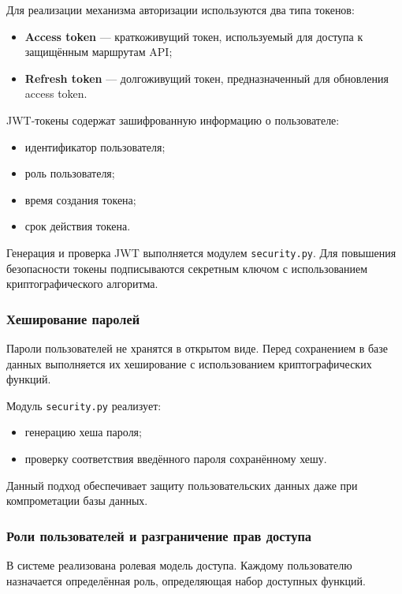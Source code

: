 Для реализации механизма авторизации используются два типа токенов:
\begin{itemize}
	\item \textbf{Access token} — краткоживущий токен, используемый для доступа к защищённым маршрутам API;
	
	\item \textbf{Refresh token} — долгоживущий токен, предназначенный для обновления access token.
\end{itemize}

JWT-токены содержат зашифрованную информацию о пользователе:
\begin{itemize}
	\item идентификатор пользователя;
	\item роль пользователя;
	\item время создания токена;
	\item срок действия токена.
\end{itemize}

Генерация и проверка JWT выполняется модулем \texttt{security.py}. Для повышения безопасности токены подписываются секретным ключом с использованием криптографического алгоритма.

\subsubsection{Хеширование паролей}

Пароли пользователей не хранятся в открытом виде. Перед сохранением в базе данных выполняется их хеширование с использованием криптографических функций.

Модуль \texttt{security.py} реализует:
\begin{itemize}
	\item генерацию хеша пароля;
	\item проверку соответствия введённого пароля сохранённому хешу.
\end{itemize}

Данный подход обеспечивает защиту пользовательских данных даже при компрометации базы данных.

\subsubsection{Роли пользователей и разграничение прав доступа}

В системе реализована ролевая модель доступа. Каждому пользователю назначается определённая роль, определяющая набор доступных функций.

